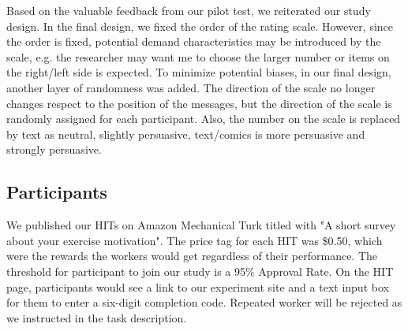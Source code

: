 Based on the valuable feedback from our pilot test, we reiterated our study design. In the final design, we fixed the order of the rating scale. However, since the order is fixed, potential demand characteristics may be introduced by the scale, e.g. the researcher may want me to choose the larger number or items on the right/left side is expected. To minimize potential biases, in our final design, another layer of randomness was added.  The direction of the scale no longer changes respect to the position of the messages, but the direction of the scale is randomly assigned for each participant. Also, the number on the scale is replaced by text as neutral, slightly persuasive, text/comics is more persuasive and strongly persuasive.
\subsection{Participants}
We published our HITs on Amazon Mechanical Turk titled with "A short survey about your exercise motivation". The price tag for each HIT was \$0.50, which were the rewards the workers would get regardless of their performance. The threshold for participant to join our study is a 95\% Approval Rate. On the HIT page, participants would see a link to our experiment site and a text input box for them to enter a six-digit completion code. Repeated worker will be rejected as we instructed in the task description.
